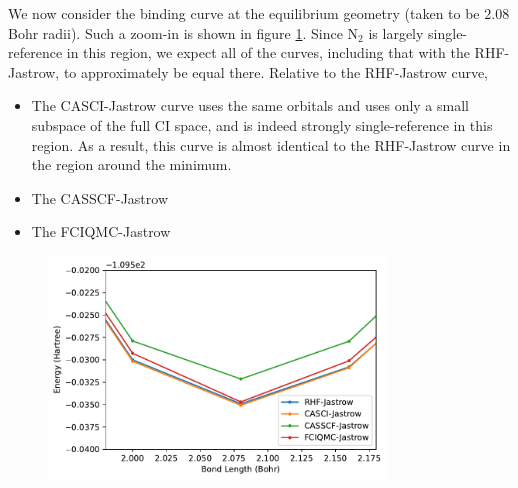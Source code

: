 We now consider the binding curve at the equilibrium geometry (taken to be $2.08$ Bohr radii). Such a zoom-in is shown in figure \ref{fig:binding-curves-minimum}. Since N$_2$ is largely single-reference in this region, we expect all of the curves, including that with the RHF-Jastrow, to approximately be equal there. Relative to the RHF-Jastrow curve,
\begin{itemize}
    \item The CASCI-Jastrow curve uses the same orbitals and uses only a small subspace of the full CI space, and is indeed strongly single-reference in this region. As a result, this curve is almost identical to the RHF-Jastrow curve in the region around the minimum.
    \item The CASSCF-Jastrow 
    \item The FCIQMC-Jastrow 
\end{itemize}


\begin{figure}[htbp]
    \centering
    \includegraphics[width=0.8\textwidth]{figures/binding/all_binding_curves_min}
    \caption{}
    \label{fig:binding-curves-minimum}
\end{figure}


